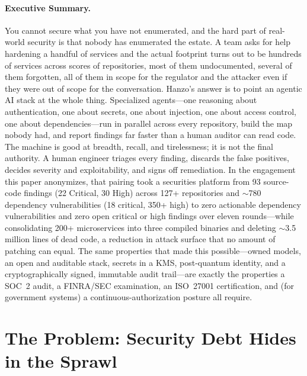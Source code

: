 \documentclass[11pt,letterpaper]{article}
\begin{document}
\paragraph{Executive Summary.}
You cannot secure what you have not enumerated, and the hard part of real-world
security is that nobody has enumerated the estate. A team asks for help hardening
a handful of services and the actual footprint turns out to be hundreds of
services across scores of repositories, most of them undocumented, several of them
forgotten, all of them in scope for the regulator and the attacker even if they
were out of scope for the conversation. Hanzo's answer is to point an agentic AI
stack at the whole thing. Specialized agents---one reasoning about
authentication, one about secrets, one about injection, one about access control,
one about dependencies---run in parallel across every repository, build the map
nobody had, and report findings far faster than a human auditor can read code.
The machine is good at breadth, recall, and tirelessness; it is not the final
authority. A human engineer triages every finding, discards the false positives,
decides severity and exploitability, and signs off remediation. In the engagement
this paper anonymizes, that pairing took a securities platform from 93 source-code
findings (22 Critical, 30 High) across 127+ repositories and $\sim$780 dependency
vulnerabilities (18 critical, 350+ high) to zero actionable dependency
vulnerabilities and zero open critical or high findings over eleven rounds---while
consolidating 200+ microservices into three compiled binaries and deleting
$\sim$3.5 million lines of dead code, a reduction in attack surface that no amount
of patching can equal. The same properties that made this possible---owned
models, an open and auditable stack, secrets in a KMS, post-quantum identity, and
a cryptographically signed, immutable audit trail---are exactly the properties a
SOC~2 audit, a FINRA/SEC examination, an ISO~27001 certification, and (for
government systems) a continuous-authorization posture all require.

\tableofcontents
\newpage

\section{The Problem: Security Debt Hides in the Sprawl}
\end{document}

